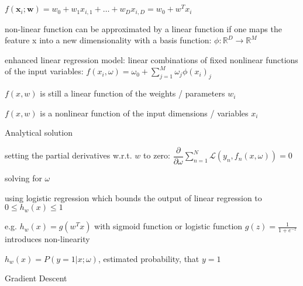 \documentclass[landscape, a4paper]{article}
\begin{document}
\begin{minipage}[t]{0.2\linewidth}
	\begin{betterlist}
		\item {}
		\begin{betterlist}
			\item $f\left(\mathbf{x}_i ; \mathbf{w}\right)=w_0+w_1 x_{i, 1}+\ldots+w_D x_{i, D}=w_0+w^T x_i$
			\item non-linear function can be approximated by a linear function if one maps the feature x into a new dimensionality with a \alert{basis function}: $\phi: \mathbb{R}^D\rightarrow \mathbb{R}^M$
			\item \alert{enhanced linear regression model:} linear combinations of fixed \alert{nonlinear functions} of the input variables: $\displaystyle f(x_i, \omega) = \omega_0 + \sum^{M}_{j=1} \omega_j\phi(x_i)_j$
			\begin{betterlist}
				\item $f(x, w)$ is still a \alert{linear function} of the weights / parameters $w_i$
				\item $f(x, w)$ is a \alert{nonlinear} function of the input dimensions / variables $x_i$
				\item Analytical solution
				\begin{betterlist}
					\item setting the \alert{partial derivatives} w.r.t. $w$ to zero: $\displaystyle\dfrac{\partial}{\partial \omega} \sum^N_{n=1} \mathcal{L}(y_n, f_n(x, \omega)) = 0$
					\item solving for $\omega$
				\end{betterlist}
			\end{betterlist}
		\end{betterlist}
		\item \aalert{Linear Classification}
		\begin{betterlist}
			\item using \alert{logistic regression} which bounds the output of linear regression to $0 \le h_w(x) \le 1$
			\begin{betterlist}
				\item e.g. $h_w(x) = g(w^Tx)$ with \alert{sigmoid} function or \alert{logistic function} $\displaystyle g(z) = \frac{1}{1 + e^{-z}}$ introduces \alert{non-linearity}
				\item $h_w(x) = P(y=1|x; \omega)$, estimated probability, that $y = 1$
			\end{betterlist}
			\item Gradient Descent

\end{betterlist}
\end{betterlist}
\end{minipage}
\end{document}
